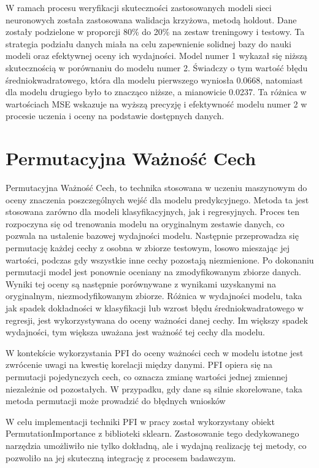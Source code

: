 \documentclass[a4paper,twoside,12pt]{book}
\begin{document}
W ramach procesu weryfikacji skuteczności zastosowanych modeli sieci neuronowych została zastosowana walidacja krzyżowa, metodą holdout. Dane zostały podzielone w proporcji 80\% do 20\% na zestaw treningowy i testowy. Ta strategia podziału danych miała na celu zapewnienie solidnej bazy do nauki modeli oraz efektywnej oceny ich wydajności. Model numer 1 wykazał się niższą skutecznością w porównaniu do modelu numer 2. Świadczy o tym wartość błędu średniokwadratowego, która dla modelu pierwszego wyniosła 0.0668, natomiast dla modelu drugiego było to znacząco niższe, a mianowicie 0.0237. Ta różnica w wartościach MSE wskazuje na wyższą precyzję i efektywność modelu numer 2 w procesie uczenia i oceny na podstawie dostępnych danych.
\newpage
\section{Permutacyjna Ważność Cech}
Permutacyjna Ważność Cech, to technika stosowana w uczeniu maszynowym do oceny znaczenia poszczególnych wejść dla modelu predykcyjnego. Metoda ta jest stosowana zarówno dla modeli klasyfikacyjnych, jak i regresyjnych. Proces ten rozpoczyna się od trenowania modelu na oryginalnym zestawie danych, co pozwala na ustalenie bazowej wydajności modelu. Następnie przeprowadza się permutację każdej cechy z osobna w zbiorze testowym, losowo mieszając jej wartości, podczas gdy wszystkie inne cechy pozostają niezmienione. Po dokonaniu permutacji model jest ponownie oceniany na zmodyfikowanym zbiorze danych. Wyniki tej oceny są następnie porównywane z wynikami uzyskanymi na oryginalnym, niezmodyfikowanym zbiorze. Różnica w wydajności modelu, taka jak spadek dokładności w klasyfikacji lub wzrost błędu średniokwadratowego w regresji, jest wykorzystywana do oceny ważności danej cechy. Im większy spadek wydajności, tym większa uważana jest ważność tej cechy dla modelu.

W kontekście wykorzystania PFI do oceny ważności cech w modelu istotne jest zwrócenie uwagi na kwestię korelacji między danymi. PFI opiera się na permutacji pojedynczych cech, co oznacza zmianę wartości jednej zmiennej niezależnie od pozostałych. W przypadku, gdy dane są silnie skorelowane, taka metoda permutacji może prowadzić do błędnych wniosków

W celu implementacji techniki PFI w pracy został wykorzystany obiekt PermutationImportance z biblioteki sklearn. Zastosowanie tego dedykowanego narzędzia umożliwiło nie tylko dokładną, ale i wydajną realizację tej metody, co pozwoliło na jej skuteczną integrację z procesem badawczym.
\end{document}
